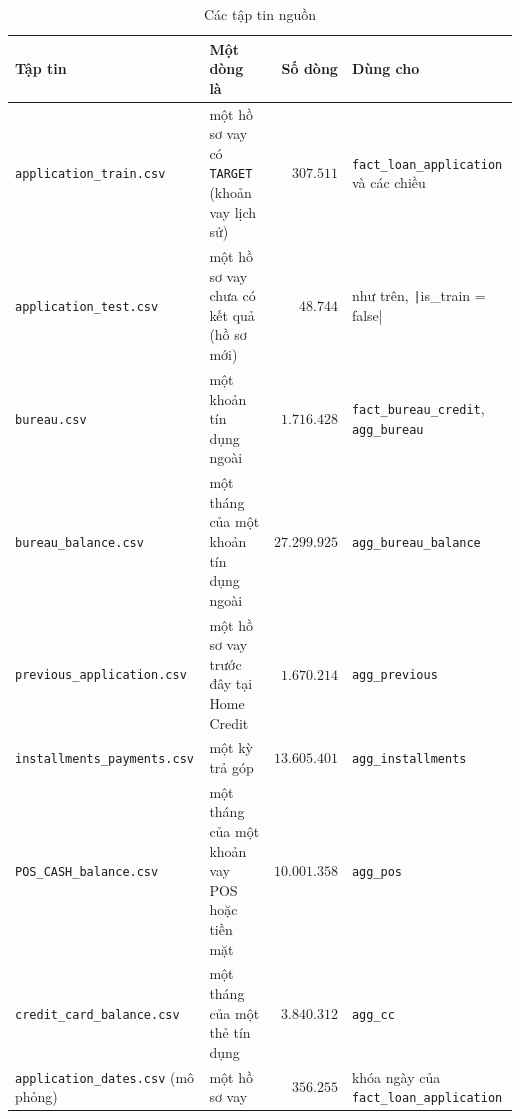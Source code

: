 \begin{table}[H]
	\centering
	\caption{Các tập tin nguồn}
	\label{tab:source-files}
	\footnotesize
	\begin{tabular}{p{4.9cm} p{4.2cm} r p{4.6cm}}
		\toprule
		\textbf{Tập tin}                           & \textbf{Một dòng là}                                 & \textbf{Số dòng} & \textbf{Dùng cho}                                                    \\
		\midrule
		\texttt{application\_train.csv}            & một hồ sơ vay có \texttt{TARGET} (khoản vay lịch sử) & $307.511$        & \texttt{fact\_loan\_application} và các chiều                        \\
		\texttt{application\_test.csv}             & một hồ sơ vay chưa có kết quả (hồ sơ mới)            & $48.744$         & như trên, \texttt|is_train = false| \\
		\texttt{bureau.csv}                        & một khoản tín dụng ngoài                             & $1.716.428$      & \texttt{fact\_bureau\_credit}, \texttt{agg\_bureau}                  \\
		\texttt{bureau\_balance.csv}               & một tháng của một khoản tín dụng ngoài               & $27.299.925$     & \texttt{agg\_bureau\_balance}                                        \\
		\texttt{previous\_application.csv}         & một hồ sơ vay trước đây tại Home Credit              & $1.670.214$      & \texttt{agg\_previous}                                               \\
		\texttt{installments\_payments.csv}        & một kỳ trả góp                                       & $13.605.401$     & \texttt{agg\_installments}                                           \\
		\texttt{POS\_CASH\_balance.csv}            & một tháng của một khoản vay POS hoặc tiền mặt        & $10.001.358$     & \texttt{agg\_pos}                                                    \\
		\texttt{credit\_card\_balance.csv}         & một tháng của một thẻ tín dụng                       & $3.840.312$      & \texttt{agg\_cc}                                                     \\
		\midrule
		\texttt{application\_dates.csv} (mô phỏng) & một hồ sơ vay                                        & $356.255$        & khóa ngày của \texttt{fact\_loan\_application}                       \\
		\bottomrule
	\end{tabular}
\end{table}

